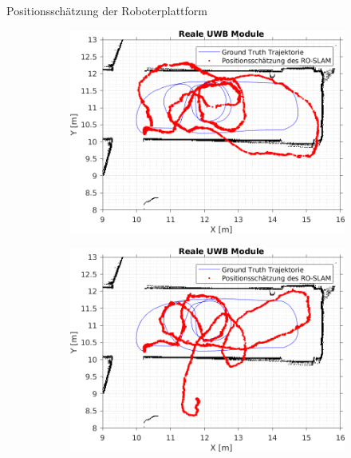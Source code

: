 \documentclass{beamer}
\begin{document}
%
%
\begin{frame}{Positionsschätzung der Roboterplattform}

	\begin{figure}
		\centering
		\begin{subfigure}{0.41\linewidth}
			\centering
			\includegraphics[width=\linewidth]{Record_2018-02-08-12-33-53_filtered_3_trajectory_pf}
		\end{subfigure}
		\hfill
		\begin{subfigure}{0.41\linewidth}
			\centering
			\includegraphics[width=\linewidth]{Record_2018-02-08-12-33-53_filtered_1_trajectory_pf}

\end{subfigure}
\end{figure}
\end{frame}
\end{document}
